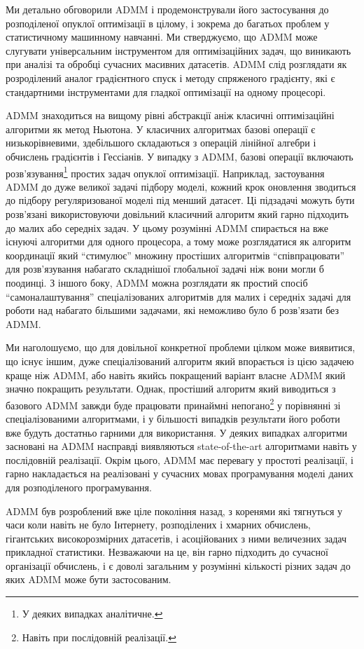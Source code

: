 Ми детально обговорили ADMM і продемонстрували його застосування до розподіленої опуклої оптимізації в цілому, і зокрема до багатьох проблем у статистичному машинному навчанні. Ми стверджуємо, що ADMM може слугувати універсальним інструментом для оптимізаційних задач, що виникають при аналізі та обробці сучасних масивних датасетів. ADMM слід розглядати як розроділений аналог градієнтного спуск і методу спряженого градієнту, які є стандартними інструментами для гладкої оптимізації на одному процесорі. \medskip

ADMM знаходиться на вищому рівні абстракції аніж класичні оптимізаційні алгоритми як метод Ньютона. У класичних алгоритмах базові операції є низькорівневими, здебільшого складаються з операцій лінійної алгебри і обчислень градієнтів і Гессіанів. У випадку з ADMM, базові операції включають розв'язування\footnote{У деяких випадках аналітичне.} простих задач опуклої оптимізації. Наприклад, застоування ADMM до дуже великої задачі підбору моделі, кожний крок оновлення зводиться до підбору регуляризованої моделі під менший датасет. Ці підзадачі можуть бути розв'язані використовуючи довільний класичний алгоритм який гарно підходить до малих або середніх задач. У цьому розумінні ADMM спирається на вже існуючі алгоритми для одного процесора, а тому може розглядатися як алгоритм координації який ``стимулює'' множину простіших алгоритмів ``співпрацювати'' для розв'язування набагато складнішої глобальної задачі ніж вони могли б поодинці. З іншого боку, ADMM можна розглядати як простий спосіб ``самоналаштування'' спеціалізованих алгоритмів для малих і середніх задачі для роботи над набагато більшими задачами, які неможливо було б розв'язати без ADMM. \medskip

Ми наголошуємо, що для довільної конкретної проблеми цілком може виявитися, що існує іншим, дуже спеціалізований алгоритм який впорається із цією задачею краще ніж ADMM, або навіть якийсь покращений варіант власне ADMM який значно покращить результати.  Однак, простіший алгоритм який виводиться з базового ADMM завжди буде працювати принаймні непогано\footnote{Навіть при послідовній реалізації.} у порівнянні зі спеціалізованими алгоритмами, і у більшості випадків результати його роботи вже будуть достатньо гарними для використання. У деяких випадках алгоритми засновані на ADMM насправді виявляються state-of-the-art алгоритмами навіть у послідовній реалізації. Окрім цього, ADMM має перевагу у простоті реалізації, і гарно накладається на реалізовані у сучасних мовах програмування моделі даних для розподіленого програмування. \medskip

ADMM був розроблений вже ціле покоління назад, з коренями які тягнуться у часи коли навіть не було Інтернету, розподілених і хмарних обчислень, гігантських високорозмірних датасетів, і асоційованих з ними величезних задач прикладної статистики. Незважаючи на це, він гарно підходить до сучасної організації обчислень, і є доволі загальним у розумінні кількості різних задач до яких ADMM може бути застосованим.